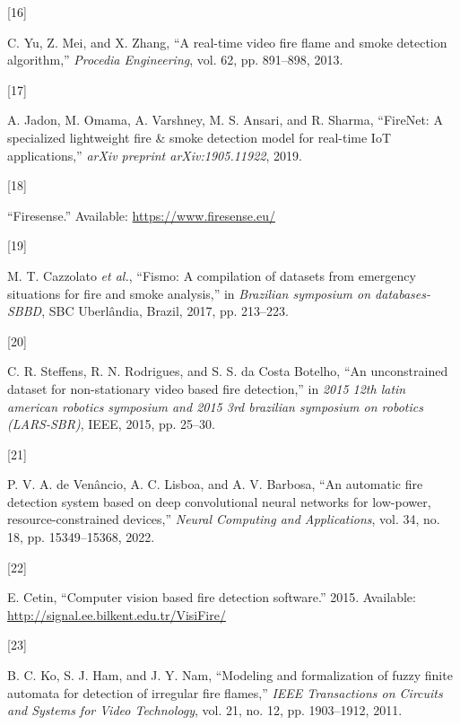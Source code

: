 \documentclass[
  10pt,
]{article}
\newlength{\cslhangindent}
\newlength{\csllabelwidth}
\newenvironment{CSLReferences}[2] %
 {\begin{list}{}{%
  \setlength{\itemindent}{0pt}
  \setlength{\leftmargin}{0pt}
  \setlength{\parsep}{0pt}
  \ifodd #1
   \setlength{\leftmargin}{\cslhangindent}
   \setlength{\itemindent}{-1\cslhangindent}
  \fi
  \setlength{\itemsep}{#2\baselineskip}}}
 {\end{list}}
\newcommand{\CSLLeftMargin}[1]{\parbox[t]{\csllabelwidth}{\strut#1\strut}}
\newcommand{\CSLRightInline}[1]{\parbox[t]{\linewidth - \csllabelwidth}{\strut#1\strut}}
\begin{document}
\begin{CSLReferences}{0}{0}
\CSLLeftMargin{{[}16{]} }%
\CSLRightInline{C. Yu, Z. Mei, and X. Zhang, {``A real-time video fire
flame and smoke detection algorithm,''} \emph{Procedia Engineering},
vol. 62, pp. 891--898, 2013.}

\CSLLeftMargin{{[}17{]} }%
\CSLRightInline{A. Jadon, M. Omama, A. Varshney, M. S. Ansari, and R.
Sharma, {``FireNet: A specialized lightweight fire \& smoke detection
model for real-time IoT applications,''} \emph{arXiv preprint
arXiv:1905.11922}, 2019.}

\CSLLeftMargin{{[}18{]} }%
\CSLRightInline{{``Firesense.''} Available:
\url{https://www.firesense.eu/}}

\CSLLeftMargin{{[}19{]} }%
\CSLRightInline{M. T. Cazzolato \emph{et al.}, {``Fismo: A compilation
of datasets from emergency situations for fire and smoke analysis,''} in
\emph{Brazilian symposium on databases-SBBD}, SBC Uberl{â}ndia, Brazil,
2017, pp. 213--223.}

\CSLLeftMargin{{[}20{]} }%
\CSLRightInline{C. R. Steffens, R. N. Rodrigues, and S. S. da Costa
Botelho, {``An unconstrained dataset for non-stationary video based fire
detection,''} in \emph{2015 12th latin american robotics symposium and
2015 3rd brazilian symposium on robotics (LARS-SBR)}, IEEE, 2015, pp.
25--30.}

\CSLLeftMargin{{[}21{]} }%
\CSLRightInline{P. V. A. de Venâncio, A. C. Lisboa, and A. V. Barbosa,
{``An automatic fire detection system based on deep convolutional neural
networks for low-power, resource-constrained devices,''} \emph{Neural
Computing and Applications}, vol. 34, no. 18, pp. 15349--15368, 2022.}

\CSLLeftMargin{{[}22{]} }%
\CSLRightInline{E. Cetin, {``Computer vision based fire detection
software.''} 2015. Available:
\url{http://signal.ee.bilkent.edu.tr/VisiFire/}}

\CSLLeftMargin{{[}23{]} }%
\CSLRightInline{B. C. Ko, S. J. Ham, and J. Y. Nam, {``Modeling and
formalization of fuzzy finite automata for detection of irregular fire
flames,''} \emph{IEEE Transactions on Circuits and Systems for Video
Technology}, vol. 21, no. 12, pp. 1903--1912, 2011.}


\end{CSLReferences}
\end{document}
